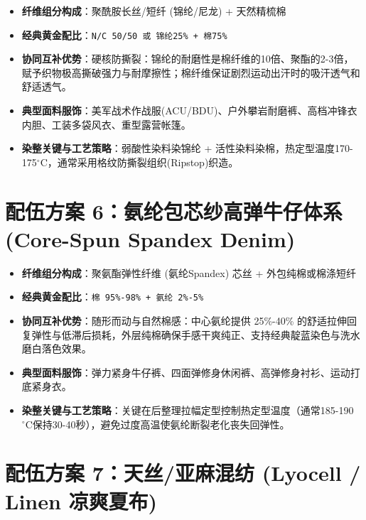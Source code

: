 \documentclass[11pt,openright,twoside,UTF8]{ctexbook}
\begin{document}
\begin{itemize} \setlength{\itemsep}{2.5pt}
    \item \textbf{纤维组分构成}：聚酰胺长丝/短纤 (锦纶/尼龙) + 天然精梳棉
    \item \textbf{经典黄金配比}：\texttt{N/C 50/50 或 锦纶25\% + 棉75\%}
    \item \textbf{协同互补优势}：硬核防撕裂：锦纶的耐磨性是棉纤维的10倍、聚酯的2-3倍，赋予织物极高撕破强力与耐摩擦性；棉纤维保证剧烈运动出汗时的吸汗透气和舒适透气。
    \item \textbf{典型面料服饰}：美军战术作战服(ACU/BDU)、户外攀岩耐磨裤、高档冲锋衣内胆、工装多袋风衣、重型露营帐篷。
    \item \textbf{染整关键与工艺策略}：弱酸性染料染锦纶 + 活性染料染棉，热定型温度170-175$^\circ\mathrm{C}$，通常采用格纹防撕裂组织(Ripstop)织造。
\end{itemize}
\vspace{0.3cm}

\section{配伍方案 6：氨纶包芯纱高弹牛仔体系 (Core-Spun Spandex Denim)}

\begin{itemize} \setlength{\itemsep}{2.5pt}
    \item \textbf{纤维组分构成}：聚氨酯弹性纤维 (氨纶Spandex) 芯丝 + 外包纯棉或棉涤短纤
    \item \textbf{经典黄金配比}：\texttt{棉 95\%-98\% + 氨纶 2\%-5\%}
    \item \textbf{协同互补优势}：随形而动与自然棉感：中心氨纶提供 25\%-40\% 的舒适拉伸回复弹性与低滞后损耗，外层纯棉确保手感干爽纯正、支持经典靛蓝染色与洗水磨白落色效果。
    \item \textbf{典型面料服饰}：弹力紧身牛仔裤、四面弹修身休闲裤、高弹修身衬衫、运动打底紧身衣。
    \item \textbf{染整关键与工艺策略}：关键在后整理拉幅定型控制热定型温度（通常185-190$^\circ\mathrm{C}$保持30-40秒），避免过度高温使氨纶断裂老化丧失回弹性。
\end{itemize}
\vspace{0.3cm}

\section{配伍方案 7：天丝/亚麻混纺 (Lyocell / Linen 凉爽夏布)}
\end{document}
